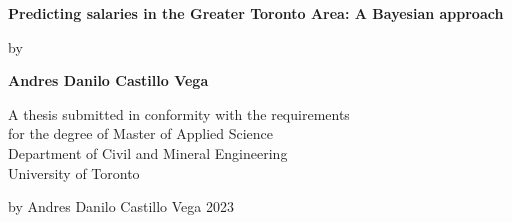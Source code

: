 \begin{titlepage}
    \begin{center}
        \vspace*{1cm}

        \Huge
        \textbf{Predicting salaries in the Greater Toronto Area: A Bayesian approach}

        \vspace{1.5cm}

        \Large
        by

        \vspace{1.5cm}

        \textbf{Andres Danilo Castillo Vega}

        \vfill

        A thesis submitted in conformity with the requirements\\
        for the degree of Master of Applied Science\\
        Department of Civil and Mineral Engineering\\
        University of Toronto

        \vspace{1.5cm}

        \Large
        \textcopyright \hspace{1pt} by Andres Danilo Castillo Vega 2023

        \vspace{0.8cm}

    \end{center}
\end{titlepage}